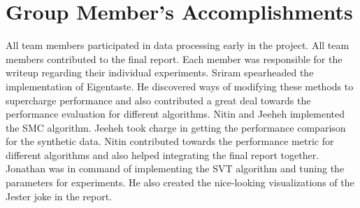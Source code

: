 \documentclass{article} %
\begin{document}
\section{Group Member's Accomplishments}

All team members participated in data processing early in the project.
All team members contributed to the final report. Each member was
responsible for the writeup regarding their individual experiments.
Sriram spearheaded the implementation of Eigentaste. He discovered
ways of modifying these methods to supercharge performance and also
contributed a great deal towards the performance evaluation for
different algorithms. Nitin and Jeeheh implemented the SMC algorithm.
Jeeheh took charge in getting the performance comparison for the
synthetic data. Nitin contributed towards the performance metric for
different algorithms and also helped integrating the final report
together. Jonathan was in command of implementing the SVT algorithm
and tuning the parameters for experiments. He also created the
nice-looking visualizations of the Jester joke in the report.




\end{document}
